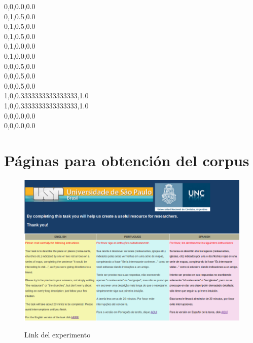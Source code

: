 0,0,0.0,0.0\\
0,1,0.5,0.0\\
0,1,0.5,0.0\\
0,1,0.5,0.0\\
0,1,0.0,0.0\\
0,1,0.0,0.0\\
0,0,0.5,0.0\\
0,0,0.5,0.0\\
0,0,0.5,0.0\\
1,0,0.3333333333333333,1.0\\
1,0,0.3333333333333333,1.0\\
0,0,0.0,0.0\\
0,0,0.0,0.0\\



\chapter{P\'aginas para obtenci\'on del corpus}
\label{corpus-apendice}

\begin{figure}[ht]
\begin{center}
\includegraphics[width=13cm]{images/pagPrincipal.png}\\[0pt]
\caption{Link del experimento}
\label{fig-pagPrincipal}
\end{center}
\end{figure}

